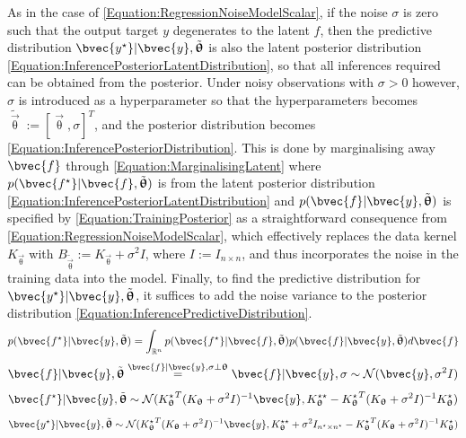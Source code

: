 				As in the case of \eqref{Equation:RegressionNoiseModelScalar}, if the noise $\sigma$ is zero such that the output target $y$ degenerates to the latent $f$, then the predictive distribution $\bvec{y^{\star}} | \bvec{y}, \tilde{\vec{\uptheta}}$ is also the latent posterior distribution \eqref{Equation:InferencePosteriorLatentDistribution}, so that all inferences required can be obtained from the posterior. Under noisy observations with $\sigma > 0$ however, $\sigma$ is introduced as a hyperparameter so that the hyperparameters becomes $\tilde{\vec{\uptheta}} := [\vec{\uptheta}, \sigma]^{T}$, and the posterior distribution becomes \eqref{Equation:InferencePosteriorDistribution}. This is done by marginalising away $\bvec{f}$ through \eqref{Equation:MarginalisingLatent} where $p(\bvec{f^{\star}} | \bvec{f}, \tilde{\vec{\uptheta}})$ is from the latent posterior distribution \eqref{Equation:InferencePosteriorLatentDistribution} and $p(\bvec{f} | \bvec{y}, \tilde{\vec{\uptheta}})$ is specified by \eqref{Equation:TrainingPosterior} as a straightforward consequence from \eqref{Equation:RegressionNoiseModelScalar}, which effectively replaces the data kernel $K_{\vec{\uptheta}}$ with $B_{\tilde{\vec{\uptheta}}} := K_{\vec{\uptheta}} + \sigma^{2} I$, where $I := I_{n \times n}$, and thus incorporates the noise in the training data into the model. Finally, to find the predictive distribution for $\bvec{y^{\star}} | \bvec{y}, \tilde{\vec{\uptheta}}$, it suffices to add the noise variance to the posterior distribution \eqref{Equation:InferencePredictiveDistribution}. \begin{equation}
					p(\bvec{f^{\star}} | \bvec{y}, \tilde{\vec{\uptheta}}) = \int_{\mathbb{R}^{n}} p(\bvec{f^{\star}} | \bvec{f}, \tilde{\vec{\uptheta}}) p(\bvec{f} | \bvec{y}, \tilde{\vec{\uptheta}}) d\bvec{f}
				\label{Equation:MarginalisingLatent}
				\end{equation} \begin{equation}
					\bvec{f} | \bvec{y}, \tilde{\vec{\uptheta}} \stackrel{\bvec{f} | \bvec{y}, \sigma \perp \vec{\uptheta}}{=} \bvec{f} | \bvec{y}, \sigma \sim \mathcal{N}(\bvec{y}, \sigma^{2} I)
				\label{Equation:TrainingPosterior}
				\end{equation} \begin{equation}
					\bvec{f^{\star}} | \bvec{y}, \tilde{\vec{\uptheta}} \sim \mathcal{N}({K_{\vec{\uptheta}}^{\star}}^{T} (K_{\vec{\uptheta}} + \sigma^{2} I)^{-1} \bvec{y}, K_{\vec{\uptheta}}^{\star \star} - {K_{\vec{\uptheta}}^{\star}}^{T} (K_{\vec{\uptheta}} + \sigma^{2} I)^{-1} K_{\vec{\uptheta}}^{\star})
				\label{Equation:InferencePosteriorDistribution}
				\end{equation} \begin{equation}
					\bvec{y^{\star}} | \bvec{y}, \tilde{\vec{\uptheta}} \sim \mathcal{N}({K_{\vec{\uptheta}}^{\star}}^{T} (K_{\vec{\uptheta}} + \sigma^{2} I)^{-1} \bvec{y}, K_{\vec{\uptheta}}^{\star \star} + \sigma^{2} I_{n^{\star} \times n^{\star}} - {K_{\vec{\uptheta}}^{\star}}^{T} (K_{\vec{\uptheta}} + \sigma^{2} I)^{-1} K_{\vec{\uptheta}}^{\star})
				\label{Equation:InferencePredictiveDistribution}
				\end{equation}
								
